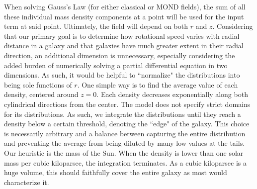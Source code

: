 \documentclass[11pt, twocolumn]{article}
\begin{document}
    When solving Gauss's Law (for either classical or MOND fields), the sum of all these individual mass density components at a point will be used for the input term at said point. Ultimately, the field will depend on both $r$ and $z$. Considering that our primary goal is to determine how rotational speed varies with radial distance in a galaxy and that galaxies have much greater extent in their radial direction, an additional dimension is unnecessary, especially considering the added burden of numerically solving a partial differential equation in two dimensions. As such, it would be helpful to ``normalize" the distributions into being sole functions of $r$. One simple way is to find the average value of each density, centered around $z = 0$. Each density decreases exponentially along both cylindrical directions from the center. The model does not specify strict domains for its distributions. As such, we integrate the distributions until they reach a density below a certain threshold, denoting the ``edge" of the galaxy. This choice is necessarily arbitrary and a balance between capturing the entire distribution and preventing the average from being diluted by many low values at the tails. Our heuristic is the mass of the Sun. When the density is lower than one solar mass per cubic kiloparsec, the integration terminates. As a cubic kiloparsec is a huge volume, this should faithfully cover the entire galaxy as most would characterize it.
    
\end{document}
